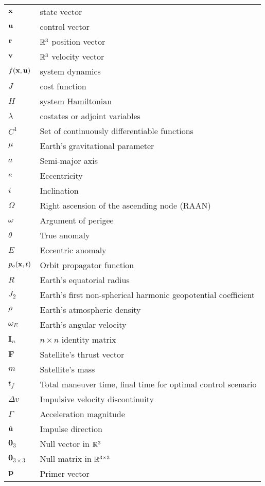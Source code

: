 \begin{longtable}{ll}
\(\mathbf{x}\) & state vector \\
\(\mathbf{u}\) & control vector \\
\(\mathbf{r}\) & \(\mathbb{R}^3\) position vector \\
\(\mathbf{v}\) & \(\mathbb{R}^3\) velocity vector \\
\(f(\mathbf{x}, \mathbf{u})\) & system dynamics \\
\(J\) & cost function \\
\(H\) & system Hamiltonian \\
\(\lambda\) & costates or adjoint variables \\
\(C^1\) & Set of continuously differentiable functions \\
\(\mu\) & Earth's gravitational parameter \\
\(a\) & Semi-major axis \\
\(e\) & Eccentricity \\
\(i\) & Inclination \\
\(\Omega \) & Right ascension of the ascending node (RAAN) \\
\(\omega \) & Argument of perigee \\
\(\theta \) & True anomaly \\
\(E\) & Eccentric anomaly \\
\(p_o(\mathbf{x}, t)\) & Orbit propagator function \\
\(R\) & Earth's equatorial radius \\
\(J_2\) & Earth's first non-spherical harmonic geopotential coefficient \\
\(\rho\) & Earth's atmospheric density \\
\(\omega_E\) & Earth's angular velocity \\
\(\mathbf{I}_n\) & \(n \times n\) identity matrix \\
\(\mathbf{F}\) & Satellite's thrust vector \\
\(m\) & Satellite's mass \\
\(t_f\) & Total maneuver time, final time for optimal control scenario \\
\(\Delta v\) & Impulsive velocity discontinuity \\
\(\Gamma\) & Acceleration magnitude \\
\(\hat{\mathbf{u}}\) & Impulse direction \\
\(\mathbf{0}_3\) & Null vector in \(\mathbb{R}^3\) \\
\(\mathbf{0}_{3 \times 3}\) & Null matrix in \(\mathbb{R}^{3 \times 3}\) \\
\(\mathbf{p}\) & Primer vector \\

\end{longtable}
